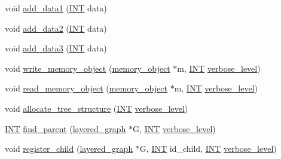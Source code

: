 \begin{DoxyCompactItemize}
\item 
void \mbox{\hyperlink{classgraph__node_a3ee49a31f1c714ad2695575c3c81c450}{add\+\_\+data1}} (\mbox{\hyperlink{galois_8h_a09fddde158a3a20bd2dcadb609de11dc}{I\+NT}} data)
\item 
void \mbox{\hyperlink{classgraph__node_acfc2c2394a77eff03f4b6d5dbf6bc1c7}{add\+\_\+data2}} (\mbox{\hyperlink{galois_8h_a09fddde158a3a20bd2dcadb609de11dc}{I\+NT}} data)
\item 
void \mbox{\hyperlink{classgraph__node_accb6acbd8e0c485c9e28a30cb902fdc3}{add\+\_\+data3}} (\mbox{\hyperlink{galois_8h_a09fddde158a3a20bd2dcadb609de11dc}{I\+NT}} data)
\item 
void \mbox{\hyperlink{classgraph__node_aaa91b8ccda069f999e10cf8bad0721ab}{write\+\_\+memory\+\_\+object}} (\mbox{\hyperlink{classmemory__object}{memory\+\_\+object}} $\ast$m, \mbox{\hyperlink{galois_8h_a09fddde158a3a20bd2dcadb609de11dc}{I\+NT}} \mbox{\hyperlink{simeon_8_c_a818073fbcc2f439e7c56952f67386122}{verbose\+\_\+level}})
\item 
void \mbox{\hyperlink{classgraph__node_a0536d089bebf0e578673b5d1b90f3a20}{read\+\_\+memory\+\_\+object}} (\mbox{\hyperlink{classmemory__object}{memory\+\_\+object}} $\ast$m, \mbox{\hyperlink{galois_8h_a09fddde158a3a20bd2dcadb609de11dc}{I\+NT}} \mbox{\hyperlink{simeon_8_c_a818073fbcc2f439e7c56952f67386122}{verbose\+\_\+level}})
\item 
void \mbox{\hyperlink{classgraph__node_a88e719c26e918b93e82fc7c4f4f87243}{allocate\+\_\+tree\+\_\+structure}} (\mbox{\hyperlink{galois_8h_a09fddde158a3a20bd2dcadb609de11dc}{I\+NT}} \mbox{\hyperlink{simeon_8_c_a818073fbcc2f439e7c56952f67386122}{verbose\+\_\+level}})
\item 
\mbox{\hyperlink{galois_8h_a09fddde158a3a20bd2dcadb609de11dc}{I\+NT}} \mbox{\hyperlink{classgraph__node_aaf92860d56470bb8dd641726a30f9cb3}{find\+\_\+parent}} (\mbox{\hyperlink{classlayered__graph}{layered\+\_\+graph}} $\ast$G, \mbox{\hyperlink{galois_8h_a09fddde158a3a20bd2dcadb609de11dc}{I\+NT}} \mbox{\hyperlink{simeon_8_c_a818073fbcc2f439e7c56952f67386122}{verbose\+\_\+level}})
\item 
void \mbox{\hyperlink{classgraph__node_af7113789b1dc112ae5b926ef82ea4f7b}{register\+\_\+child}} (\mbox{\hyperlink{classlayered__graph}{layered\+\_\+graph}} $\ast$G, \mbox{\hyperlink{galois_8h_a09fddde158a3a20bd2dcadb609de11dc}{I\+NT}} id\+\_\+child, \mbox{\hyperlink{galois_8h_a09fddde158a3a20bd2dcadb609de11dc}{I\+NT}} \mbox{\hyperlink{simeon_8_c_a818073fbcc2f439e7c56952f67386122}{verbose\+\_\+level}})
\item 

\end{DoxyCompactItemize}
